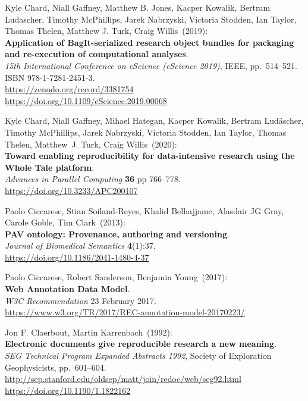 \begin{thebibliography}{9}
Kyle Chard, Niall Gaffney, Matthew B. Jones, Kacper Kowalik,
Bertram Ludascher, Timothy McPhillips, Jarek Nabrzyski, Victoria
Stodden, Ian Taylor, Thomas Thelen, Matthew J. Turk, Craig Willis~(2019): \\
\textbf{Application of BagIt-serialized research object bundles for
packaging and re-execution of computational analyses}.\\
\emph{15th International Conference on eScience (eScience 2019)}, IEEE,
pp.~514--521.\\
ISBN 978-1-7281-2451-3.\\
\url{https://zenodo.org/record/3381754}\\
\url{https://doi.org/10.1109/eScience.2019.00068}

Kyle Chard, Niall Gaffney, Mihael Hategan, Kacper Kowalik,
Bertram Ludäscher, Timothy McPhillips, Jarek Nabrzyski, Victoria
Stodden, Ian Taylor, Thomas Thelen, Matthew~J. Turk, Craig Willis~(2020): \\
\textbf{Toward enabling reproducibility for data-intensive research
using the Whole Tale platform}.\\
\emph{Advances in Parallel Computing} \textbf{36} pp 766--778.\\
\url{https://doi.org/10.3233/APC200107}

Paolo Ciccarese, Stian Soiland-Reyes, Khalid Belhajjame, Alasdair JG
Gray, Carole Goble, Tim Clark~(2013): \\
\textbf{PAV ontology: Provenance, authoring and versioning}. \\
\emph{Journal of Biomedical Semantics} \textbf{4}(1):37.\\
\url{https://doi.org/10.1186/2041-1480-4-37}

Paolo Ciccarese, Robert Sanderson, Benjamin Young~(2017): \\
\textbf{Web Annotation Data Model}.\\
\emph{W3C Recommendation} 23 February 2017.\\
\url{https://www.w3.org/TR/2017/REC-annotation-model-20170223/}

Jon F. Claerbout, Martin Karrenbach~(1992): \\
\textbf{Electronic documents give reproducible research a new
meaning}.\\
\emph{SEG Technical Program Expanded Abstracts 1992}, Society of
Exploration Geophysicists, pp.~601--604.\\
\url{http://sep.stanford.edu/oldsep/matt/join/redoc/web/seg92.html}\\
\url{https://doi.org/10.1190/1.1822162}


\end{thebibliography}
